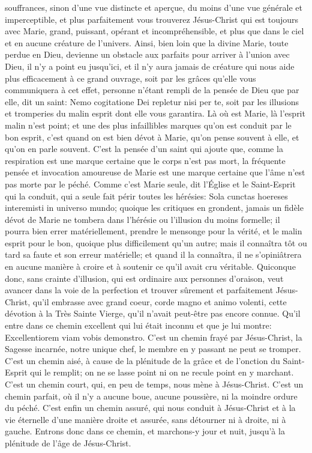 souffrances, sinon d'une vue distincte et aperçue, du moins d'une vue générale et imperceptible, et plus
parfaitement vous trouverez Jésus-Christ qui est toujours avec Marie, grand, puissant, opérant et
incompréhensible, et plus que dans le ciel et en aucune créature de l'univers. Ainsi, bien loin que la divine Marie,
toute perdue en Dieu, devienne un obstacle aux parfaits pour arriver à l'union avec Dieu, il n'y a point eu jusqu'ici,
et il n'y aura jamais de créature qui nous aide plus efficacement à ce grand ouvrage, soit par les grâces qu'elle
vous communiquera à cet effet, personne n'étant rempli de la pensée de Dieu que par elle, dit un saint: Nemo
cogitatione Dei repletur nisi per te, soit par les illusions et tromperies du malin esprit dont elle vous garantira.
 Là où est Marie, là l'esprit malin n'est point; et une des plus infaillibles marques qu'on est conduit par le bon
esprit, c'est quand on est bien dévot à Marie, qu'on pense souvent à elle, et qu'on en parle souvent. C'est la
pensée d'un saint qui ajoute que, comme la respiration est une marque certaine que le corps n'est pas mort, la
fréquente pensée et invocation amoureuse de Marie est une marque certaine que l'âme n'est pas morte par le
péché.
 Comme c'est Marie seule, dit l'Église et le Saint-Esprit qui la conduit, qui a seule fait périr toutes les hérésies:
Sola cunctas hoereses interemisti in universo mundo; quoique les critiques en grondent, jamais un fidèle dévot de
Marie ne tombera dans l'hérésie ou l'illusion du moins formelle; il pourra bien errer matériellement, prendre le
mensonge pour la vérité, et le malin esprit pour le bon, quoique plus difficilement qu'un autre; mais il connaîtra tôt
ou tard sa faute et son erreur matérielle; et quand il la connaîtra, il ne s'opiniâtrera en aucune manière à croire et à
soutenir ce qu'il avait cru véritable.
 Quiconque donc, sans crainte d'illusion, qui est ordinaire aux personnes d'oraison, veut avancer dans la voie
de la perfection et trouver sûrement et parfaitement Jésus-Christ, qu'il embrasse avec grand coeur, corde magno
et animo volenti, cette dévotion à la Très Sainte Vierge, qu'il n'avait peut-être pas encore connue. Qu'il entre dans
ce chemin excellent qui lui était inconnu et que je lui montre: Excellentiorem viam vobis demonstro. C'est un
chemin frayé par Jésus-Christ, la Sagesse incarnée, notre unique chef, le membre en y passant ne peut se
tromper. C'est un chemin aisé, à cause de la plénitude de la grâce et de l'onction du Saint-Esprit qui le remplit; on
ne se lasse point ni on ne recule point en y marchant. C'est un chemin court, qui, en peu de temps, nous mène à
Jésus-Christ. C'est un chemin parfait, où il n'y a aucune boue, aucune poussière, ni la moindre ordure du péché.
C'est enfin un chemin assuré, qui nous conduit à Jésus-Christ et à la vie éternelle d'une manière droite et assurée,
sans détourner ni à droite, ni à gauche. Entrons donc dans ce chemin, et marchons-y jour et nuit, jusqu'à la
plénitude de l'âge de Jésus-Christ.
